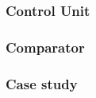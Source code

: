 

\subsubsection{Control Unit} \label{fpga:selection:sss:control_unit}



\subsubsection {Comparator} \label{fpga:selection:sss:comparator}



\subsubsection{Case study} \label{fpga:selection:sss:case_study}




